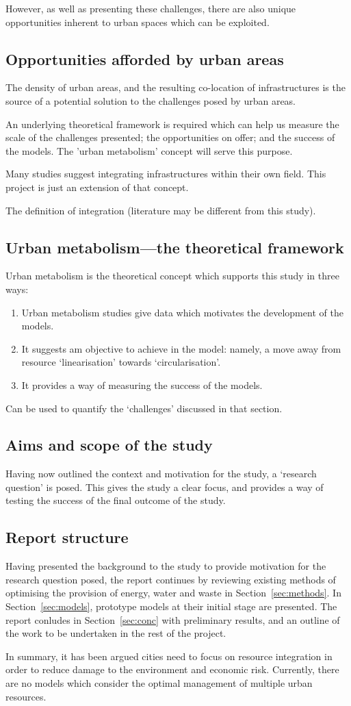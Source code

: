 However, as well as presenting these challenges, there are also unique opportunities inherent to urban spaces which can be exploited.

\subsection{Opportunities afforded by urban areas}
The density of urban areas, and the resulting co-location of infrastructures is the source of a potential solution to the challenges posed by urban areas.

An underlying theoretical framework is required which can help us measure the scale of the challenges presented; the opportunities on offer; and the success of the models. The 'urban metabolism' concept will serve this purpose.

Many studies suggest integrating infrastructures within their own field. This project is just an extension of that concept.

The definition of integration (literature may be different from this study).


\subsection{Urban metabolism---the theoretical framework}
Urban metabolism is the theoretical concept which supports this study in three ways:
\begin{enumerate}
	\item Urban metabolism studies give data which motivates the development of the models.
	\item It suggests am objective to achieve in the model: namely, a move away from resource `linearisation' towards `circularisation'.
	\item It provides a way of measuring the success of the models.
\end{enumerate}
Can be used to quantify the `challenges' discussed in that section.

\subsection{Aims and scope of the study}
Having now outlined the context and motivation for the study, a `research question' is posed. This gives the study a clear focus, and provides a way of testing the success of the final outcome of the study.


\subsection{Report structure}
Having presented the background to the study to provide motivation for the research question posed, the report continues by reviewing existing methods of optimising the provision of energy, water and waste in Section~\ref{sec:methods}. In Section~\ref{sec:models}, prototype models at their initial stage are presented. The report conludes in Section~\ref{sec:conc} with preliminary results, and an outline of the work to be undertaken in the rest of the project.

In summary, it has been argued cities need to focus on resource integration in order to reduce damage to the environment and economic risk. Currently, there are no models which consider the optimal management of multiple urban resources.
